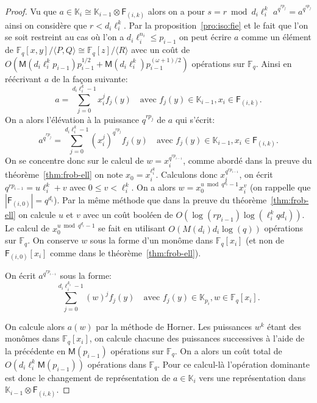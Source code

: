 \documentclass[10pt,a4paper]{book}
\theoremstyle{plain}
\theoremstyle{definition}
\theoremstyle{definition}
\theoremstyle{definition}
\theoremstyle{definition}
\theoremstyle{remark}
\theoremstyle{remark}
\theoremstyle{definition}
\begin{document}
\begin{proof}
Vu que $a \in \mathbb{K}_{i} \cong \mathbb{K}_{i-1} \otimes \mathsf{F}_{(i,k)}$
 alors on a pour $s=r \bmod d_i \ell_i^{k}$ 
$a^{q^{r p_j}}=a^{q^{s p_j}}$ ainsi on considère que $r<d_i \ell_i^{k}$.
Par la proposition~\ref{pro:iso:fie} et le fait que l'on se soit restreint au 
cas où l'on a $d_i\ell_i^{n_i} \leqslant p_{i-1}$ on peut écrire $a$ comme un 
élément de 
$\mathbb{F}_q[x,y]/\langle P,Q \rangle \cong \mathbb{F}_q[z]/\langle R \rangle$
 avec un coût de 
 $O(\mathsf{M}(d_i\ell_i^{k}p_{i-1})p_{i-1}^{1/2}+\mathsf{M}(d_i\ell_i^{k})p_{i-1}^{(\omega+1)/2})$ 
 opérations sur $\mathbb{F}_q$.
Ainsi en réécrivant $a$ de la façon suivante:
\begin{equation*}
a=\sum_{j=0}^{d_i\ell_i^{k}-1}x_i^{j}f_{j}(y) \quad \text{avec } f_{j}(y) \in \mathbb{K}_{i-1}, x_i \in \mathsf{F}_{(i,k)}.
\end{equation*}
On a alors l'élévation à la puissance $q^{r p_j}$ de $a$ qui s'écrit:
\begin{equation*}
a^{q^{r p_j}}=\sum_{j=0}^{d_i\ell_i^{k}-1}(x_i^{j})^{q^{r p_j}}f_{j}(y) \quad \text{avec } f_{j}(y) \in \mathbb{K}_{i-1}, x_i \in \mathsf{F}_{(i,k)}.
\end{equation*} 
On se concentre donc sur le calcul de $w=x_i^{q^{r p_{i-1}}}$, comme abordé dans la 
preuve du théorème~\ref{thm:frob-ell} on note $x_0=x_i^{\ell_i^{k}}$. 
Calculons donc $x_i^{q^{r p_{i-1}}}$, on écrit $q^{r p_{i-1}}= u \ell_i^{k}+v$ avec 
$0 \leqslant v<\ell_i^{k}$. On a alors $w=x_0^{u \bmod q^{d_i}-1}x_i^{v}$ (on 
rappelle que $|\mathsf{F}_{(i,0)}|=q^{d_i}$). Par la même méthode que dans la 
preuve du théorème~\ref{thm:frob-ell} on calcule $u$ et $v$ avec un coût 
booléen de $O(\log(rp_{i-1})\log(\ell_i^{k}qd_i))$. Le calcul de $x_0^{u \bmod q^{d_i}-1}$ 
se fait en utilisant $O( M(d_i) d_i\log(q))$ opérations sur $\mathbb{F}_q$. On 
conserve $w$ sous la forme d'un monôme dans $\mathbb{F}_q[x_i]$ (et non de 
$\mathsf{F}_{(i,0)}[x_i]$ comme dans le théorème~\ref{thm:frob-ell}).

On écrit $a^{q^{r p_{i-1}}}$ sous la forme:
\begin{equation*}
\sum_{j=0}^{d_i\ell_i^{k_i}-1}(w)^{j}f_{j}(y) \quad \text{avec } f_{j}(y) \in \mathbb{K}_{p_i}, w \in \mathbb{F}_{q}[x_i].
\end{equation*}

On calcule alors $a(w)$ par la méthode de Horner. Les puissances $w^k$ étant 
des monômes dans $\mathbb{F}_q[x_i]$, on calcule chacune des puissances 
successives à l'aide de la précédente en $\mathsf{M}(p_{i-1})$ opérations sur 
$\mathbb{F}_q$. On a alors un coût total de 
$O(d_i\ell_i^{k}\mathsf{M}(p_{i-1}))$ opérations dans $\mathbb{F}_q$. 
Pour ce calcul-là l'opération dominante est donc le changement de 
représentation de $a \in \mathbb{K}_i$ vers une représentation dans 
$\mathbb{K}_{i-1} \otimes \mathsf{F}_{(i,k)}$.
\end{proof}
\end{document}
